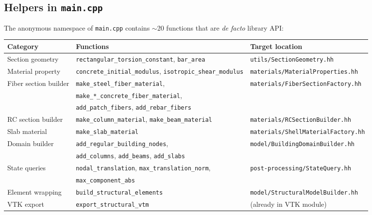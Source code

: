 \subsection{Helpers in \texttt{main.cpp}}

The anonymous namespace of \texttt{main.cpp} contains $\sim$20 functions
that are \emph{de facto} library API:

\begin{center}
\small
\begin{tabular}{lll}
\toprule
\textbf{Category} & \textbf{Functions} & \textbf{Target location} \\
\midrule
Section geometry &
  \texttt{rectangular\_torsion\_constant},
  \texttt{bar\_area} &
  \texttt{utils/SectionGeometry.hh} \\
Material property &
  \texttt{concrete\_initial\_modulus},
  \texttt{isotropic\_shear\_modulus} &
  \texttt{materials/MaterialProperties.hh} \\
Fiber section builder &
  \texttt{make\_steel\_fiber\_material}, &
  \texttt{materials/FiberSectionFactory.hh} \\
  & \texttt{make\_*\_concrete\_fiber\_material}, & \\
  & \texttt{add\_patch\_fibers},
    \texttt{add\_rebar\_fibers} & \\
RC section builder &
  \texttt{make\_column\_material},
  \texttt{make\_beam\_material} &
  \texttt{materials/RCSectionBuilder.hh} \\
Slab material &
  \texttt{make\_slab\_material} &
  \texttt{materials/ShellMaterialFactory.hh} \\
Domain builder &
  \texttt{add\_regular\_building\_nodes}, &
  \texttt{model/BuildingDomainBuilder.hh} \\
  & \texttt{add\_columns},
    \texttt{add\_beams},
    \texttt{add\_slabs} & \\
State queries &
  \texttt{nodal\_translation},
  \texttt{max\_translation\_norm}, &
  \texttt{post-processing/StateQuery.hh} \\
  & \texttt{max\_component\_abs} & \\
Element wrapping &
  \texttt{build\_structural\_elements} &
  \texttt{model/StructuralModelBuilder.hh} \\
VTK export &
  \texttt{export\_structural\_vtm} & (already in VTK module) \\
\bottomrule
\end{tabular}
\end{center}


